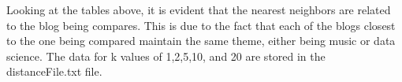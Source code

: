 \documentclass[11pt]{scrartcl} %
\begin{document}
\bigskip
\tabto{2.0cm} Looking at the tables above, it is evident that the nearest neighbors are related to the blog being compares. This is due to the fact that each of the blogs closest to the one being compared maintain the same theme, either being music or data science. The data for k values of 1,2,5,10, and 20 are stored in the distanceFile.txt file.
\end{document}
